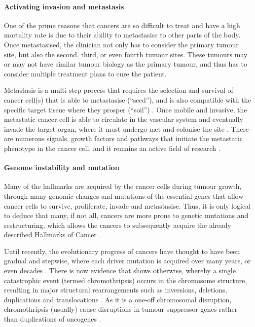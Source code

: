 \paragraph{Activating invasion and metastasis}

\noindent
One of the prime reasons that cancers are so difficult to treat and have a high mortality rate is due to their ability to metastasise to other parts of the body.
Once metastasised, the clinician not only has to consider the primary tumour site, but also the second, third, or even fourth tumour sites.
These tumours may or may not have similar tumour biology as the primary tumour, and thus has to consider multiple treatment plans to cure the patient.

Metastasis is a multi-step process that requires the selection and survival of cancer cell(s) that is able to metastasise (``seed''), and is also compatible with the specific target tissue where they prosper (``soil'') \citep{Talmadge2010}.
Once mobile and invasive, the metastatic cancer cell is able to circulate in the vascular system and eventually invade the target organ, where it must undergo \gls{met} and colonise the site \citep{Hanahan2011,Kalluri2009}.
There are numerous signals, growth factors and pathways that initiate the metastatic phenotype in the cancer cell, and it remains an active field of research \citep{Hanahan2011,Kalluri2009}.

\paragraph{Genome instability and mutation}

\noindent
Many of the hallmarks are acquired by the cancer cells during tumour growth, through many genomic changes and mutations of the essential genes that allow cancer cells to survive, proliferate, invade and metastasise.
Thus, it is only logical to deduce that many, if not all, cancers are more prone to genetic mutations and restructuring, which allows the cancers to subsequently acquire the already described Hallmarks of Cancer \citep{Hanahan2011}.

Until recently, the evolutionary progress of cancers have thought to have been gradual and stepwise, where each driver mutation is acquired over many years, or even decades \citep{Stephens2011}.
There is now evidence that shows otherwise, whereby a single catastrophic event (termed \gls{chromothripsis}) occurs in the chromosome structure, resulting in major structural rearrangements such as inversions, deletions, duplications and translocations \citep{Leibowitz2015,Stephens2011}.
As it is a one-off chromosomal disruption, \gls{chromothripsis} (usually) cause disruptions in tumour suppressor genes rather than duplications of oncogenes \citep{Leibowitz2015}.

